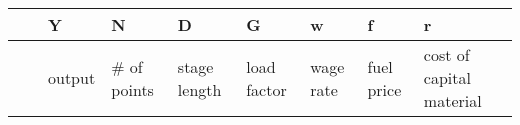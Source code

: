 \documentclass[]{article}
\begin{document}
\begin{longtable}[]{@{}lllllllll@{}}
\toprule
\begin{minipage}[b]{0.08\columnwidth}\raggedright
\strut
\end{minipage} & \begin{minipage}[b]{0.08\columnwidth}\raggedright
\strut
\end{minipage} & \begin{minipage}[b]{0.08\columnwidth}\raggedright
Y\strut
\end{minipage} & \begin{minipage}[b]{0.08\columnwidth}\raggedright
N\strut
\end{minipage} & \begin{minipage}[b]{0.08\columnwidth}\raggedright
D\strut
\end{minipage} & \begin{minipage}[b]{0.08\columnwidth}\raggedright
G\strut
\end{minipage} & \begin{minipage}[b]{0.08\columnwidth}\raggedright
w\strut
\end{minipage} & \begin{minipage}[b]{0.08\columnwidth}\raggedright
f\strut
\end{minipage} & \begin{minipage}[b]{0.08\columnwidth}\raggedright
r\strut
\end{minipage}\tabularnewline
\midrule
\endhead
\begin{minipage}[t]{0.08\columnwidth}\raggedright
\strut
\end{minipage} & \begin{minipage}[t]{0.08\columnwidth}\raggedright
\strut
\end{minipage} & \begin{minipage}[t]{0.08\columnwidth}\raggedright
output\strut
\end{minipage} & \begin{minipage}[t]{0.08\columnwidth}\raggedright
\# of points\strut
\end{minipage} & \begin{minipage}[t]{0.08\columnwidth}\raggedright
stage length\strut
\end{minipage} & \begin{minipage}[t]{0.08\columnwidth}\raggedright
load factor\strut
\end{minipage} & \begin{minipage}[t]{0.08\columnwidth}\raggedright
wage rate\strut
\end{minipage} & \begin{minipage}[t]{0.08\columnwidth}\raggedright
fuel price\strut
\end{minipage} & \begin{minipage}[t]{0.08\columnwidth}\raggedright
cost of capital material\strut
\end{minipage}\tabularnewline
\bottomrule
\end{longtable}
\end{document}
